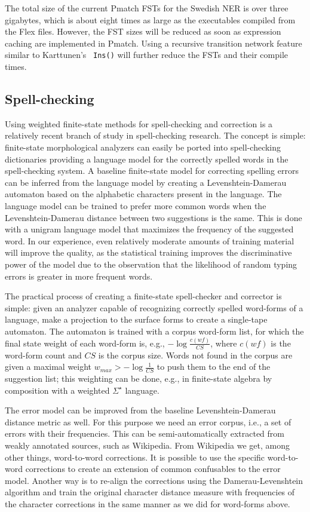 \documentclass{llncs}
\begin{document}
The total size of the current Pmatch
FSTs for the Swedish NER is over three gigabytes, which is about eight times as large as the
executables compiled from the Flex files. However, the FST sizes
will be reduced as soon as expression caching
are implemented in Pmatch. Using a recursive transition network
feature similar to Karttunen's~\cite{karttunen/2011} \texttt{Ins()}
will further reduce the FSTs and their compile times.

\subsection{Spell-checking}
Using weighted finite-state methods for spell-checking and correction 
is a relatively recent branch of study in spell-checking research. The concept
is simple: finite-state morphological analyzers can easily be ported
into spell-checking dictionaries providing a language model for the correctly
spelled words in the spell-checking system. A baseline finite-state model for
correcting spelling errors can be inferred from the language model by creating
a Levenshtein-Damerau automaton based on the alphabetic characters present in
the language. The language model can be trained to prefer more common
words when the Levenshtein-Damerau distance between two suggestions is the same.
This is done with a unigram language model that maximizes
the frequency of the suggested word. In our experience, even relatively moderate
amounts of training material will improve the quality, as the statistical training
improves the discriminative power of the model due to the observation that the likelihood of random
typing errors is greater in more frequent words.

The practical process of creating a finite-state spell-checker and corrector
is simple: given an analyzer capable of recognizing correctly spelled
word-forms of a language, make a projection to the surface forms to create a
single-tape automaton. The automaton is trained with a corpus word-form list, 
for which the final state weight of each word-form is, e.g., $-\log\frac{c(wf)}{CS}$, where 
$c(wf)$ is the word-form count and $CS$ is the corpus size. Words not
found in the corpus are given a maximal weight $w_{max} > -\log\frac{1}{CS}$ to
push them to the end of the suggestion list; this weighting can be done, e.g.,
in finite-state algebra by composition with a weighted $\Sigma^{\star}$ language.

The error model can be improved from the baseline Levenshtein-Damerau distance
metric as well. For this purpose we need an error corpus, i.e., a set of
errors with their frequencies. This can be semi-automatically extracted from
weakly annotated sources, such as Wikipedia. From Wikipedia we get, among 
other things, word-to-word corrections. It is possible to use the specific
word-to-word corrections to create an extension of common confusables to the
error model. Another way is to re-align the corrections using the
Damerau-Levenshtein algorithm and train the original character distance measure with
frequencies of the character corrections in the same manner as we did for word-forms above.
\end{document}
